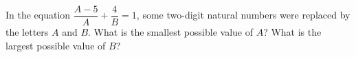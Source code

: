 In the equation $\dfrac{A-5}{A}+\dfrac{4}{B}=1$, some two-digit natural numbers were replaced by the letters $A$ and $B$. What is the smallest possible value of $A$? What is the largest possible value of $B$?

